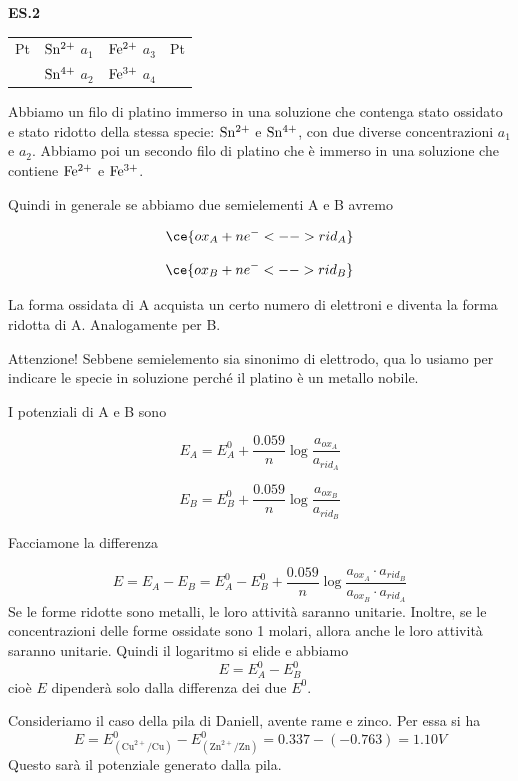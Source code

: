 \vspace{0.2cm}\textbf{ES.2}

\begin{center}
    \begin{tabular}{p{0.6cm}|p{1.6cm}||p{1.6cm}|p{2cm}}
        Pt & $\rm Sn^{2+}$ $a_1$ & $\rm Fe^{2+}$ $a_3$ & Pt\\[0.5ex]
         & $\rm Sn^{4+}$ $a_2$ & $\rm Fe^{3+}$ $a_4$&\\[0.5ex]
    \end{tabular}
\end{center}

Abbiamo un filo di platino immerso in una soluzione che contenga stato ossidato e stato ridotto della stessa specie: $\rm Sn^{2+}$ e $\rm Sn^{4+}$, con due diverse concentrazioni $a_1$ e $a_2$. Abbiamo poi un secondo filo di platino che è immerso in una soluzione che contiene $\rm Fe^{2+}$ e $\rm Fe^{3+}$.

Quindi in generale se abbiamo due semielementi A e B avremo

$$\ce{ox_A + ne^- <--> rid_A}$$

$$\ce{ox_B + ne^- <--> rid_B}$$

La forma ossidata di A acquista un certo numero di elettroni e diventa la forma ridotta di A. Analogamente per B.

Attenzione! Sebbene semielemento sia sinonimo di elettrodo, qua lo usiamo per indicare le specie in soluzione perché il platino è un metallo nobile.

I potenziali di A e B sono

$$E_A = E^0_{A} + \frac{0.059}{n} \log \frac{a_{ox_{A}}}{a_{rid_{A}}}$$

$$E_B = E^0_{B} + \frac{0.059}{n} \log \frac{a_{ox_{B}}}{a_{rid_{B}}}$$

Facciamone la differenza

$$E = E_A - E_B = E^0_{A} - E^0_{B} + \frac{0.059}{n} \log \frac{a_{ox_{A}} \cdot a_{rid_{B}}}{a_{ox_{B}}  \cdot a_{rid_{A}}}$$
Se le forme ridotte sono metalli, le loro attività saranno unitarie. Inoltre, se le concentrazioni delle forme ossidate sono 1 molari, allora anche le loro attività saranno unitarie. Quindi il logaritmo si elide e abbiamo
$$E=E^0_{A} - E^0_{B}$$
cioè $E$ dipenderà solo dalla differenza dei due $E^0$.

Consideriamo il caso della pila di Daniell, avente rame e zinco. Per essa si ha
$$E=E^0_{(\text{Cu}^{2+}/\text{Cu})} - E^0_{(\text{Zn}^{2+}/\text{Zn})} = 0.337 - (-0.763) = 1.10 V$$
Questo sarà il potenziale generato dalla pila.

